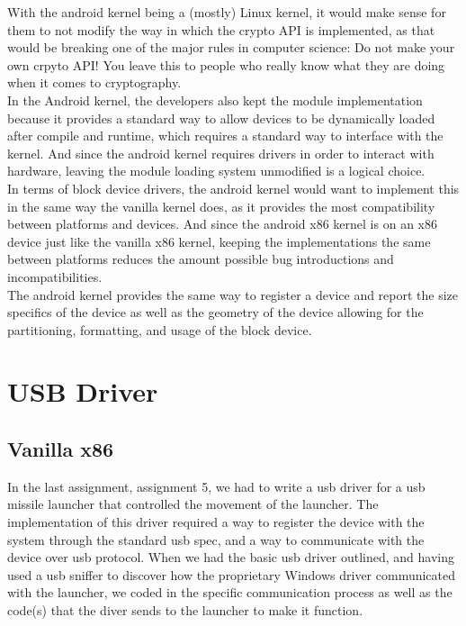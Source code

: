 \documentclass[letterpaper,10pt,titlepage]{article}
\begin{document}
With the android kernel being a (mostly) Linux kernel, it would make sense for them to not modify the way in which the crypto API is implemented, as that would be breaking one of the major rules in computer science: Do not make your own crpyto API! You leave this to people who really know what they are doing when it comes to cryptography.\\

In the Android kernel, the developers also kept the module implementation because it provides a standard way to allow devices to be dynamically loaded after compile and runtime, which requires a standard way to interface with the kernel. And since the android kernel requires drivers in order to interact with hardware, leaving the module loading system unmodified is a logical choice.\\

In terms of block device drivers, the android kernel would want to implement this in the same way the vanilla kernel does, as it provides the most compatibility between platforms and devices. And since the android x86 kernel is on an x86 device just like the vanilla x86 kernel, keeping the implementations the same between platforms reduces the amount possible bug introductions and incompatibilities.\\

The android kernel provides the same way to register a device and report the size specifics of the device as well as the geometry of the device allowing for the partitioning, formatting, and usage of the block device.

\newpage
\section{USB Driver}
\subsection*{Vanilla x86}

In the last assignment, assignment 5, we had to write a usb driver for a usb missile launcher that controlled the movement of the launcher. The implementation of this driver required a way to register the device with the system through the standard usb spec, and a way to communicate with the device over usb protocol. When we had the basic usb driver outlined, and having used a usb sniffer to discover how the proprietary Windows driver communicated with the launcher, we coded in the specific communication process as well as the code(s) that the diver sends to the launcher to make it function.\\
\end{document}
